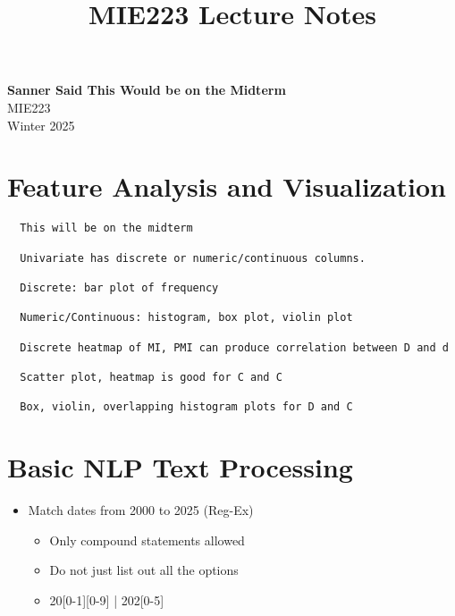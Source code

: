 \documentclass[11pt]{article}
\theoremstyle{definition}
\begin{document}
\setcounter{section}{0}
\title{MIE223 Lecture Notes}

\thispagestyle{empty}

\begin{center}
{\LARGE \bf Sanner Said This Would be on the Midterm}\\
{\large MIE223}\\
Winter 2025
\end{center}

\section{Feature Analysis and Visualization}
\begin{verbatim}
  This will be on the midterm
  
  Univariate has discrete or numeric/continuous columns.
  
  Discrete: bar plot of frequency

  Numeric/Continuous: histogram, box plot, violin plot

  Discrete heatmap of MI, PMI can produce correlation between D and d

  Scatter plot, heatmap is good for C and C

  Box, violin, overlapping histogram plots for D and C

\end{verbatim}

\section{Basic NLP Text Processing}
\begin{itemize}
  \item Match dates from 2000 to 2025 (Reg-Ex)
  \begin{itemize}
    \item Only compound statements allowed
    \item Do not just list out all the options
    \item 20[0-1][0-9] | 202[0-5]
  \end{itemize}
\end{itemize}
\end{document}
